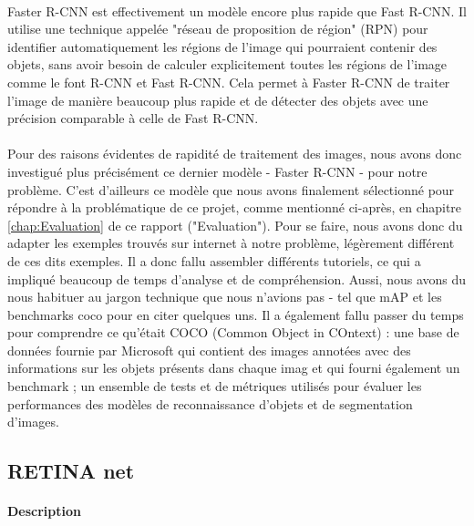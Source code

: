 \paragraph{} Faster R-CNN est effectivement un modèle encore plus rapide que Fast R-CNN. Il utilise une technique appelée "réseau de proposition de région" (RPN) pour identifier automatiquement les régions de l'image qui pourraient contenir des objets, sans avoir besoin de calculer explicitement toutes les régions de l'image comme le font R-CNN et Fast R-CNN. Cela permet à Faster R-CNN de traiter l'image de manière beaucoup plus rapide et de détecter des objets avec une précision comparable à celle de Fast R-CNN.

\paragraph{} Pour des raisons évidentes de rapidité de traitement des images, nous avons donc investigué plus précisément ce dernier modèle - Faster R-CNN - pour notre problème. C'est d'ailleurs ce modèle que nous avons finalement sélectionné pour répondre à la problématique de ce projet, comme mentionné ci-après, en chapitre \autoref{chap:Evaluation} de ce rapport ("Evaluation").\newline
Pour se faire, nous avons donc du adapter les exemples trouvés sur internet à notre problème, légèrement différent de ces dits exemples. Il a donc fallu assembler différents tutoriels, ce qui a impliqué beaucoup de temps d'analyse et de compréhension. Aussi, nous avons du nous habituer au jargon technique que nous n'avions pas - tel que mAP et les benchmarks coco pour en citer quelques uns. Il a également fallu passer du temps pour comprendre ce qu'était COCO (Common Object in COntext) : une base de données fournie par Microsoft qui contient des images annotées avec des informations sur les objets présents dans chaque imag et qui fourni également un benchmark ; un ensemble de tests et de métriques utilisés pour évaluer les performances des modèles de reconnaissance d'objets et de segmentation d'images.


\subsection{RETINA net}

\paragraph{Description}

